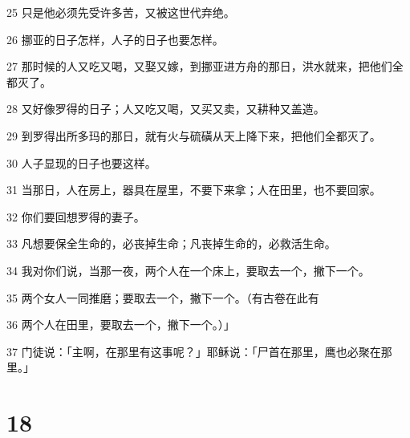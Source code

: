 \par 25 只是他必须先受许多苦，又被这世代弃绝。
\par 26 挪亚的日子怎样，人子的日子也要怎样。
\par 27 那时候的人又吃又喝，又娶又嫁，到挪亚进方舟的那日，洪水就来，把他们全都灭了。
\par 28 又好像罗得的日子；人又吃又喝，又买又卖，又耕种又盖造。
\par 29 到罗得出所多玛的那日，就有火与硫磺从天上降下来，把他们全都灭了。
\par 30 人子显现的日子也要这样。
\par 31 当那日，人在房上，器具在屋里，不要下来拿；人在田里，也不要回家。
\par 32 你们要回想罗得的妻子。
\par 33 凡想要保全生命的，必丧掉生命；凡丧掉生命的，必救活生命。
\par 34 我对你们说，当那一夜，两个人在一个床上，要取去一个，撇下一个。
\par 35 两个女人一同推磨；要取去一个，撇下一个。（有古卷在此有
\par 36 两个人在田里，要取去一个，撇下一个。）」
\par 37 门徒说：「主啊，在那里有这事呢？」耶稣说：「尸首在那里，鹰也必聚在那里。」

\chapter{18}

